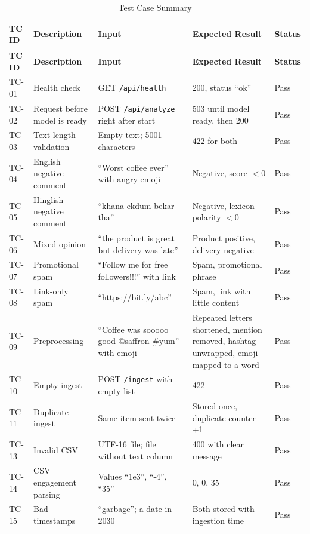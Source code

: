 \documentclass[12pt,a4paper]{report}
\begin{document}
\begin{longtable}{|P{1.2cm}|P{3.6cm}|P{3.4cm}|P{3.6cm}|P{1.6cm}|}
\caption{Test Case Summary}
\label{tab:testcases}\\
\hline
\textbf{TC ID} & \textbf{Description} & \textbf{Input} & \textbf{Expected Result} & \textbf{Status} \\
\hline
\endfirsthead
\hline
\textbf{TC ID} & \textbf{Description} & \textbf{Input} & \textbf{Expected Result} & \textbf{Status} \\
\hline
\endhead
TC-01 & Health check & GET \texttt{/api/health} & 200, status ``ok'' & Pass \\ \hline
TC-02 & Request before model is ready & POST \texttt{/api/analyze} right after start & 503 until model ready, then 200 & Pass \\ \hline
TC-03 & Text length validation & Empty text; 5001 characters & 422 for both & Pass \\ \hline
TC-04 & English negative comment & ``Worst coffee ever'' with angry emoji & Negative, score $< 0$ & Pass \\ \hline
TC-05 & Hinglish negative comment & ``khana ekdum bekar tha'' & Negative, lexicon polarity $< 0$ & Pass \\ \hline
TC-06 & Mixed opinion & ``the product is great but delivery was late'' & Product positive, delivery negative & Pass \\ \hline
TC-07 & Promotional spam & ``Follow me for free followers!!!'' with link & Spam, promotional phrase & Pass \\ \hline
TC-08 & Link-only spam & ``https://bit.ly/abc'' & Spam, link with little content & Pass \\ \hline
TC-09 & Preprocessing & ``Coffee was sooooo good @saffron \#yum'' with emoji & Repeated letters shortened, mention removed, hashtag unwrapped, emoji mapped to a word & Pass \\ \hline
TC-10 & Empty ingest & POST \texttt{/ingest} with empty list & 422 & Pass \\ \hline
TC-11 & Duplicate ingest & Same item sent twice & Stored once, duplicate counter +1 & Pass \\ \hline
TC-13 & Invalid CSV & UTF-16 file; file without text column & 400 with clear message & Pass \\ \hline
TC-14 & CSV engagement parsing & Values ``1e3'', ``-4'', ``35'' & 0, 0, 35 & Pass \\ \hline
TC-15 & Bad timestamps & ``garbage''; a date in 2030 & Both stored with ingestion time & Pass \\ \hline

\end{longtable}
\end{document}
